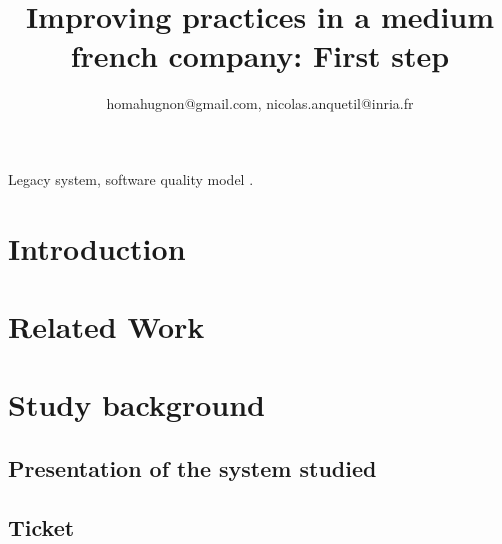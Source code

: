 \documentclass[10pt,conference]{IEEEtran}
\begin{document}
\title{Improving practices in a medium french  company: First step}

\author{
homahugnon@gmail.com, nicolas.anquetil@inria.fr}


\maketitle

\begin{abstract}
\end{abstract}

\begin{IEEEkeywords}
Legacy system, software quality model .
\end{IEEEkeywords}

\section{Introduction}

 
\section{Related Work}
\label{sec:related-work}

\section{Study background}
\label{sec:background}


\subsection{Presentation of the system studied}

\subsection{Ticket}
\end{document}
